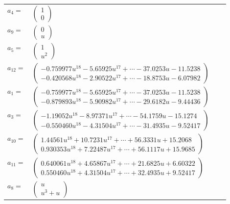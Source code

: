 \documentclass[1p]{elsarticle_modified}
\theoremstyle{definition}
\begin{document}
\begin{tabular}{m{7pt} m{180pt} m{7pt} m{180pt} }
\flushright $a_{4}=$&$\begin{pmatrix}1\\0\end{pmatrix}$ \\
\flushright $a_{9}=$&$\begin{pmatrix}0\\u\end{pmatrix}$ \\
\flushright $a_{5}=$&$\begin{pmatrix}1\\u^2\end{pmatrix}$ \\
\flushright $a_{12}=$&$\begin{pmatrix}-0.759977 u^{18}-5.65925 u^{17}+\cdots-37.0253 u-11.5238\\-0.420568 u^{18}-2.90522 u^{17}+\cdots-18.8753 u-6.07982\end{pmatrix}$ \\
\flushright $a_{1}=$&$\begin{pmatrix}-0.759977 u^{18}-5.65925 u^{17}+\cdots-37.0253 u-11.5238\\-0.879893 u^{18}-5.90982 u^{17}+\cdots-29.6182 u-9.44436\end{pmatrix}$ \\
\flushright $a_{3}=$&$\begin{pmatrix}-1.19052 u^{18}-8.97371 u^{17}+\cdots-54.1759 u-15.1274\\-0.550460 u^{18}-4.31504 u^{17}+\cdots-31.4935 u-9.52417\end{pmatrix}$ \\
\flushright $a_{10}=$&$\begin{pmatrix}1.44561 u^{18}+10.7231 u^{17}+\cdots+56.3331 u+15.2068\\0.930353 u^{18}+7.22487 u^{17}+\cdots+56.1117 u+15.9685\end{pmatrix}$ \\
\flushright $a_{11}=$&$\begin{pmatrix}0.640061 u^{18}+4.65867 u^{17}+\cdots+21.6825 u+6.60322\\0.550460 u^{18}+4.31504 u^{17}+\cdots+32.4935 u+9.52417\end{pmatrix}$ \\
\flushright $a_{8}=$&$\begin{pmatrix}u\\u^3+u\end{pmatrix}$ \\

\end{tabular}
\end{document}
